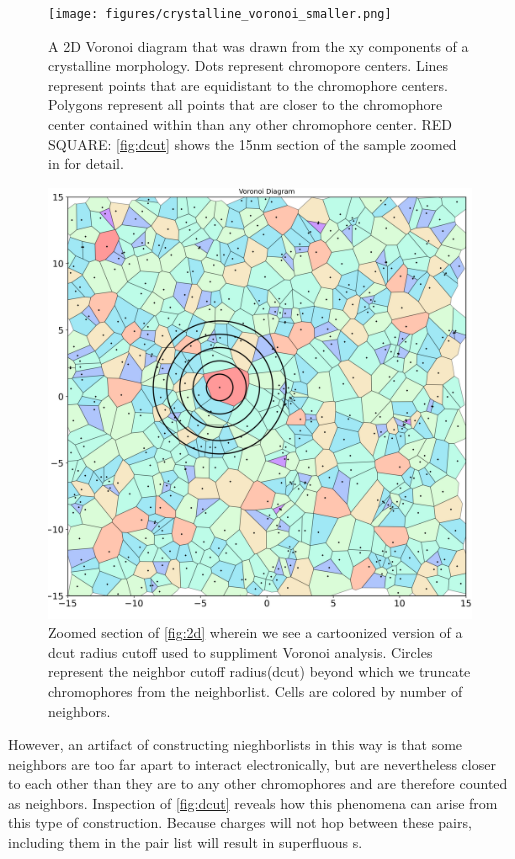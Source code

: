 \begin{figure}
  \center
  \texttt{[image: figures/crystalline\_voronoi\_smaller.png]} 
  \caption{A 2D Voronoi diagram that was drawn from the xy components of a crystalline  morphology. Dots
    represent chromopore centers. Lines represent points that are equidistant to the chromophore centers.
    Polygons represent all points that are closer to the chromophore center contained within than any other
    chromophore center. RED SQUARE: \autoref{fig:dcut} shows the 15nm section of the sample zoomed in for
    detail.}
  \label{fig:2d}
\end{figure}
\begin{figure}
  \center
  \includegraphics[width=\linewidth]{figures/crystalline_voronoi_d_cut_circles.png} 
    \caption{Zoomed section of \autoref{fig:2d} wherein we see a cartoonized version of a dcut radius cutoff
    used to suppliment Voronoi analysis. Circles represent the neighbor cutoff
    radius(dcut) beyond which we truncate chromophores from the neighborlist.
    Cells are colored by number of neighbors.}
  \label{fig:dcut}
\end{figure}

However, an artifact of constructing nieghborlists in this way is that some
neighbors are too far apart to interact electronically, but are nevertheless closer to each other than they
are to any other chromophores and are therefore counted as neighbors. 
Inspection of \autoref{fig:dcut} reveals how this phenomena can arise from this type of construction.
Because charges will not hop between these pairs, including them in the pair list will result in 
superfluous s. 

